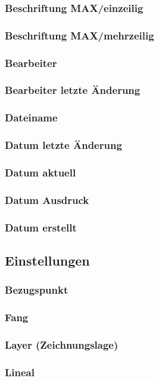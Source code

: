 \documentclass[a5paper]{book}
\begin{document}
			\subsubsection{Beschriftung MAX/einzeilig} 
			\subsubsection{Beschriftung MAX/mehrzeilig}
			\subsubsection{Bearbeiter} 
			\subsubsection{Bearbeiter letzte Änderung} 
			\subsubsection{Dateiname} 
			\subsubsection{Datum letzte Änderung} 
			\subsubsection{Datum aktuell} 
			\subsubsection{Datum Ausdruck}
			\subsubsection{Datum erstellt} 
		\subsection{Einstellungen}
			\subsubsection{Bezugspunkt} 
			\subsubsection{Fang} 
			\subsubsection{Layer (Zeichnungslage)} 
			\subsubsection{Lineal} 
\end{document}
